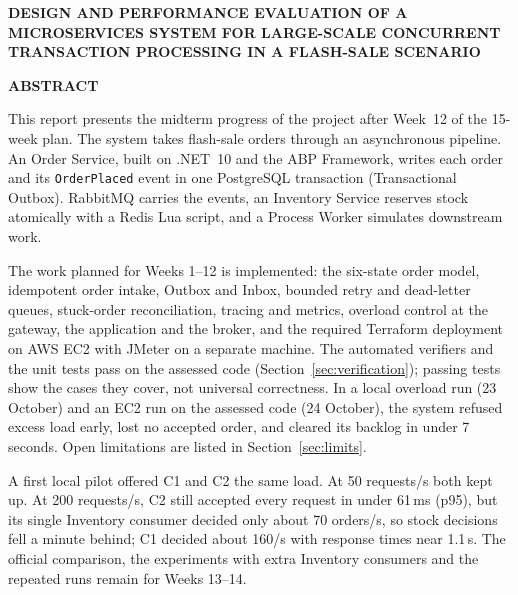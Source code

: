 \documentclass[12pt,a4paper]{article}
\newcommand{\projecttitle}{DESIGN AND PERFORMANCE EVALUATION OF A MICROSERVICES SYSTEM FOR LARGE-SCALE CONCURRENT TRANSACTION PROCESSING IN A FLASH-SALE SCENARIO}
\begin{document}
\onehalfspacing
{}
\setcounter{page}{1}

\begin{center}
{\fontsize{14}{17}\selectfont\bfseries \projecttitle\par}
\vspace{6pt}
{\fontsize{16}{19}\selectfont\bfseries ABSTRACT\par}
\end{center}

This report presents the midterm progress of the project after Week~12 of the
15-week plan. The system takes flash-sale orders through an asynchronous
pipeline. An Order Service, built on .NET~10 and the ABP Framework, writes each
order and its \texttt{OrderPlaced} event in one PostgreSQL transaction
(Transactional Outbox). RabbitMQ carries the events, an Inventory Service
reserves stock atomically with a Redis Lua script, and a Process Worker
simulates downstream work.

The work planned for Weeks 1--12 is implemented: the six-state order model,
idempotent order intake, Outbox and Inbox, bounded retry and dead-letter
queues, stuck-order reconciliation, tracing and metrics, overload control at
the gateway, the application and the broker, and the required Terraform
deployment on AWS EC2 with JMeter on a separate machine. The automated
verifiers and the unit tests pass on the assessed code
(Section~\ref{sec:verification}); passing tests show the cases they cover,
not universal correctness. In a local overload run (23 October) and an EC2
run on the assessed code (24 October), the system refused excess load early,
lost no accepted order, and cleared its backlog in under 7 seconds. Open limitations are listed in Section~\ref{sec:limits}.

A first local pilot offered C1 and C2 the same load. At 50 requests/s both
kept up. At 200 requests/s, C2 still accepted every request in under 61\,ms
(p95), but its single Inventory consumer decided only about 70 orders/s, so
stock decisions fell a minute behind; C1 decided about 160/s with response
times near 1.1\,s. The official comparison, the experiments with extra
Inventory consumers and the repeated runs remain for Weeks 13--14.

\clearpage
\begin{singlespace}
\renewcommand{\contentsname}{\centering\fontsize{16}{19}\selectfont TABLE OF CONTENTS}
\tableofcontents
\end{singlespace}
\clearpage
{}
\setcounter{page}{1}
\end{document}
